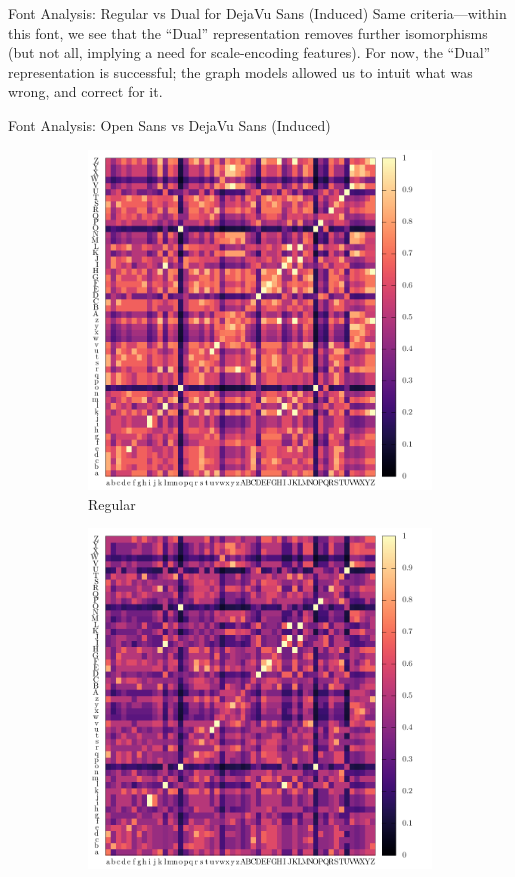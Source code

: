 \begin{frame}{Font Analysis: Regular vs Dual for DejaVu Sans (Induced)}
	Same criteria---within this font, we see that the ``Dual'' representation removes further isomorphisms (but not all, implying a need for scale-encoding features).
	For now, the ``Dual'' representation is successful; \alert{the graph models allowed us to intuit what was wrong, and correct for it.}
\end{frame}

\begin{frame}{Font Analysis: Open Sans vs DejaVu Sans (Induced)}
	\begin{figure}
		\centering
		\begin{subfigure}[b]{0.4\linewidth}
			\includegraphics[width=\linewidth, height=0.9\linewidth]{../tables/open-sans-dejavu-sans/induced-conf-nrm.pdf}
			\caption{
				Regular
			}
		\end{subfigure}
		\begin{subfigure}[b]{0.4\linewidth}
			\includegraphics[width=\linewidth, height=0.9\linewidth]{../tables/dual-open-sans-dejavu-sans/induced-conf-nrm.pdf}

\end{subfigure}
\end{figure}
\end{frame}
